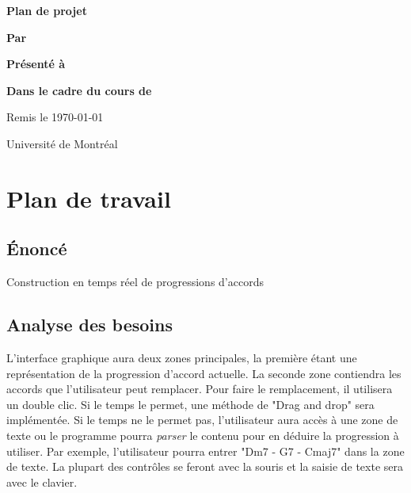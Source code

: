 \documentclass[letterpaper,12pt]{scrartcl}
\begin{document}
	\begin{center}
		\vspace{2cm}

		{\Huge\bf\sf Plan de projet}
		\vspace{4cm}

		{\bf\sf Par}

		\vspace{0.5cm}{\large\bf\sf François Poitras}

		\vspace{2cm}

		{\bf\sf Présenté à}

		\vspace{0.5cm}{\large\bf\sf Olivier Bélanger}

		\vspace{2cm}

		{\bf\sf Dans le cadre du cours de}

		\vspace{0.5cm}{\large\bf\sf Création Musicale en Language Python 2 (MUS2323)}

		\vspace{\fill}
		Remis le \today

		\vspace{0.5cm}
		Université de Montréal
	\end{center}

	\newpage
	
	\section{Plan de travail}
	\subsection{Énoncé}
	Construction en temps réel de progressions d'accords
	\subsection{Analyse des besoins}
	
	L'interface graphique aura deux zones principales, la première étant une représentation de la progression d'accord actuelle. La seconde zone contiendra les accords que l'utilisateur peut remplacer. Pour faire le remplacement, il utilisera un double clic. Si le temps le permet, une méthode de "Drag and drop" sera implémentée. Si le temps ne le permet pas, l'utilisateur aura accès à une zone de texte ou le programme pourra \textit{parser} le contenu pour en déduire la progression à utiliser. Par exemple, l'utilisateur pourra entrer "Dm7 - G7 - Cmaj7" dans la zone de texte. La plupart des contrôles se feront avec la souris et la saisie de texte sera avec le clavier.
	
\end{document}
